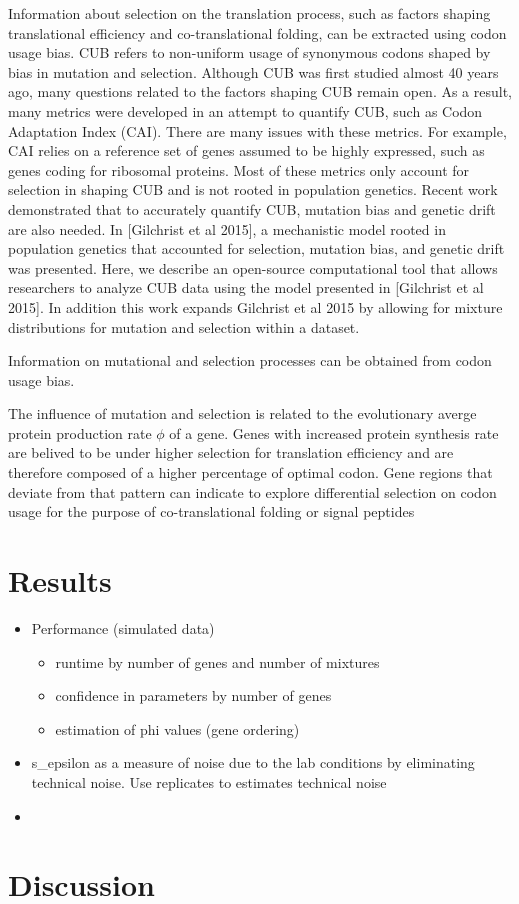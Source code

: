 \documentclass[12pt,draft]{article}
\begin{document}
Information about selection on the translation process, such as factors shaping translational efficiency and co-translational folding, can be extracted using codon usage bias.
CUB refers to non-uniform usage of synonymous codons shaped by bias in mutation and selection.
Although CUB was first studied almost 40 years ago, many questions related to the factors shaping CUB remain open.
As a result, many metrics were developed in an attempt to quantify CUB, such as Codon Adaptation Index (CAI).
There are many issues with these metrics.
For example, CAI relies on a reference set of genes assumed to be highly expressed, such as genes coding for ribosomal proteins.
Most of these metrics only account for selection in shaping CUB and is not rooted in population genetics. 
Recent work demonstrated that to accurately quantify CUB, mutation bias and genetic drift are also needed.
In [Gilchrist et al 2015], a mechanistic model rooted in population genetics that accounted for selection, mutation bias, and genetic drift was presented. 
Here, we describe an open-source computational tool that allows researchers to analyze CUB data using the model presented in [Gilchrist et al 2015].
In addition this work expands Gilchrist et al 2015 by allowing for mixture distributions for mutation and selection within a dataset.




Information on mutational and selection processes can be obtained from codon usage bias.
 
The influence of mutation and selection is related to the evolutionary averge protein production rate $\phi$ of a gene.
Genes with increased protein synthesis rate are belived to be under higher selection for translation efficiency and are therefore composed of a higher percentage of optimal codon.
Gene regions that deviate from that pattern can indicate to explore differential selection on codon usage for the purpose of co-translational folding or signal peptides


\section*{Results}
\begin{itemize}
\item Performance (simulated data)
	\begin{itemize}
	\item runtime by number of genes and number of mixtures
	\item confidence in parameters by number of genes
	\item estimation of phi values (gene ordering)
	\end{itemize}
\item s_epsilon as a measure of noise due to the lab conditions by eliminating technical 			noise. Use replicates to estimates technical noise

\item 
\end{itemize}


\section*{Discussion}
\end{document}

